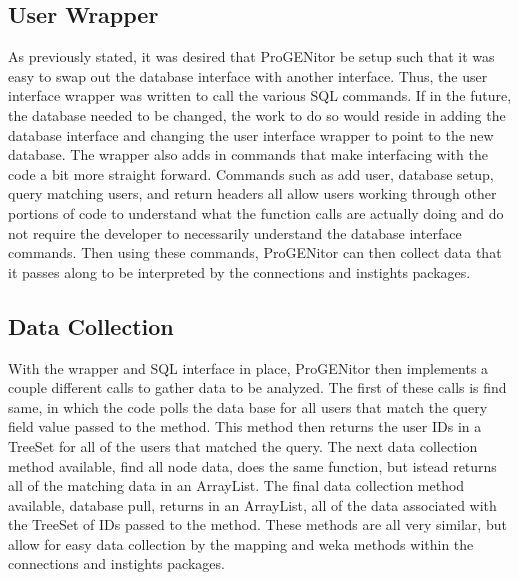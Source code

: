 \subsection{User Wrapper}
As previously stated, it was desired that ProGENitor be setup such that it was
easy to swap out the database interface with another interface.  Thus, the user
interface wrapper was written to call the various SQL commands.  If in the
future, the database needed to be changed, the work to do so would reside in
adding the database interface and changing the user interface wrapper to point
to the new database.  The wrapper also adds in commands that make interfacing
with the code a bit more straight forward.  Commands such as add user, database
setup, query matching users, and return headers all allow users working through
other portions of code to understand what the function calls are actually doing
and do not require the developer to necessarily understand the database
interface commands.  Then using these commands, ProGENitor can then collect
data that it passes along to be interpreted by the connections and instights
packages.

\subsection{Data Collection}
With the wrapper and SQL interface in place, ProGENitor then implements a couple
different calls to gather data to be analyzed.  The first of these calls is find
same, in which the code polls the data base for all users that match the query
field value passed to the method.  This method then returns the user IDs in a
TreeSet for all of the users that matched the query.  The next data collection
method available, find all node data, does the same function, but istead returns all of the
matching data in an ArrayList.  The final data collection method available,
database pull, returns in an ArrayList, all of the data associated with the
TreeSet of IDs passed to the method.  These methods are all very similar, but
allow for easy data collection by the mapping and weka methods within the
connections and instights packages.

